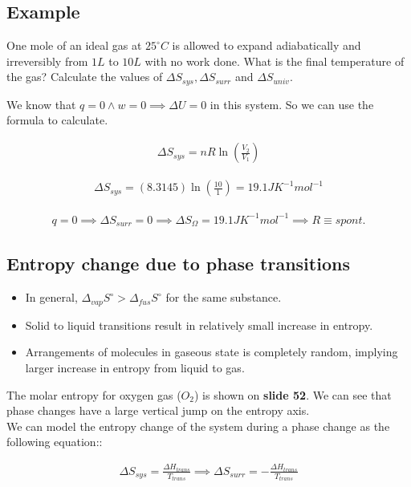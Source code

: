 \documentclass[12pt]{book}
\begin{document}
\subsection*{Example}

One mole of an ideal gas at $25^{\circ}C$ is allowed to expand adiabatically
and irreversibly from $1L$ to $10 L$ with no work done. What is the final
temperature of the gas? Calculate the values of $\Delta S_{sys}, \Delta S_{surr}$ and $\Delta S_{univ}$.

We know that $q=0\land w=0\implies \Delta U=0$ in this system. So we can use the formula to calculate.

\begin{align*}
    \Delta S_{sys}=nR\ln\left(\frac{V_2}{V_1}\right)
\end{align*}

\begin{align*}
    \Delta S_{sys}=(8.3145)\ln\left(\frac{10}{1}\right)=19.1JK^{-1}mol^{-1}
\end{align*}

\begin{align*}
    q=0\implies\Delta S_{surr}=0\implies \Delta S_{\Omega}=19.1JK^{-1}mol^{-1}\implies R\equiv spont.
\end{align*}

\subsection*{Entropy change due to phase transitions}

\begin{itemize}
    \item In general, $\Delta_{vap} S^{\circ}>\Delta_{fus} S^{\circ}$ for the same substance.
    \item Solid to liquid transitions result in relatively small increase in entropy.
    \item Arrangements of molecules in gaseous state is completely random, implying larger increase in entropy from liquid to gas.
\end{itemize}

The molar entropy for oxygen gas ($O_2$) is shown on \textbf{slide 52}. We can see that phase changes have a large vertical jump on the entropy axis.\\

We can model the entropy change of the system during a phase change as the following equation::

\begin{align*}
    \Delta S_{sys}=\frac{\Delta H_{trans}}{T_{trans}}\implies \Delta S_{surr}=-\frac{\Delta H_{trans}}{T_{trans}}
\end{align*}
\end{document}
